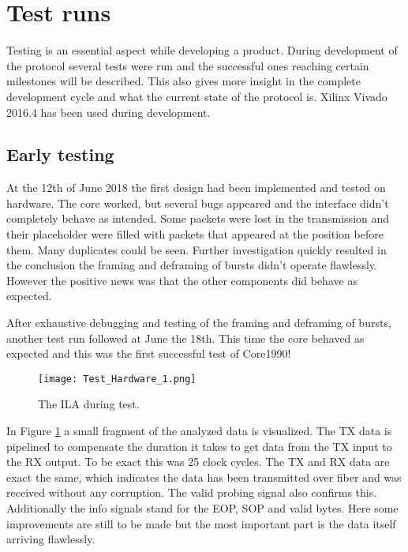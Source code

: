 \section{Test runs}
	Testing is an essential aspect while developing a product. During development of the protocol several tests were run and the successful ones reaching certain milestones will be described. This also gives more insight in the complete development cycle and what the current state of the protocol is. Xilinx Vivado 2016.4 has been used during development.
	
	\subsection{Early testing}
	At the 12th of June 2018 the first design had been implemented and tested on hardware. The core worked, but several bugs appeared and the interface didn't completely behave as intended. Some packets were lost in the transmission and their placeholder were filled with packets that appeared at the position before them. Many duplicates could be seen. Further investigation quickly resulted in the conclusion the framing and deframing of bursts didn't operate flawlessly. However the positive news was that the other components did behave as expected.
	
	After exhaustive debugging and testing of the framing and deframing of bursts, another test run followed at June the 18th. This time the core behaved as expected and this was the first successful test of Core1990!
	
	\begin{figure}[H]
		\centering
		\texttt{[image: Test\_Hardware\_1.png]}	
		\caption{The ILA during test.}
		\label{Fig:Test_Hardware_1}
	\end{figure}
	
	In Figure \ref{Fig:Test_Hardware_1} a small fragment of the analyzed data is visualized. The TX data is pipelined to compensate the duration it takes to get data from the TX input to the RX output. To be exact this was 25 clock cycles. The TX and RX data are exact the same, which indicates the data has been transmitted over fiber and was received without any corruption. The valid probing signal also confirms this.
	Additionally the info signals stand for the EOP, SOP and valid bytes. Here some improvements are still to be made but the most important part is the data itself arriving flawlessly.
	
	
